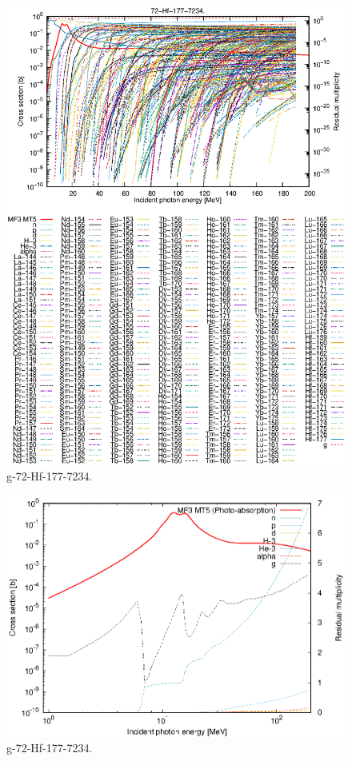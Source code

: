 \begin{figure}
 \includegraphics[width=\linewidth]{eps/g_72-Hf-177_7234.eps}
  \caption{g-72-Hf-177-7234.}
\end{figure}
\newpage \clearpage

\begin{figure}
 \includegraphics[width=\linewidth]{eps-log/g_72-Hf-177_7234.eps}
 \caption{g-72-Hf-177-7234.}
\end{figure}
\newpage \clearpage

